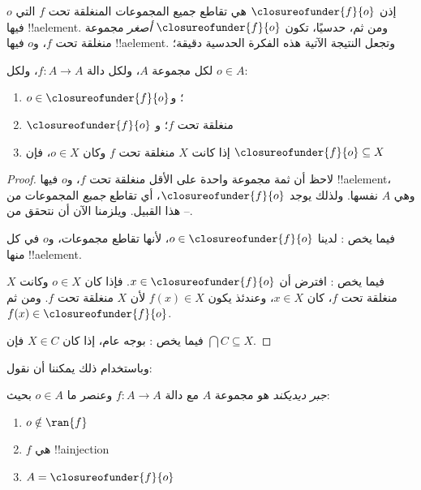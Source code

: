 \documentclass[../../../include/open-logic-section]{subfiles}
\begin{document}
إذن $\closureofunder{f}{o}$ هي تقاطع جميع المجموعات المنغلقة تحت $f$
التي $o$ فيها !!a{element}. ومن ثم، حدسيًا، تكون
$\closureofunder{f}{o}$ \emph{أصغر} مجموعة منغلقة تحت $f$، و$o$ فيها
!!a{element}. وتجعل النتيجة الآتية هذه الفكرة الحدسية دقيقة؛
\begin{lem}
	لكل مجموعة $A$، ولكل دالة $f\colon A\to A$، ولكل $o \in A$:
	\begin{enumerate}
		\item{} $o \in \closureofunder{f}{o}$؛ و
		\item{} $\closureofunder{f}{o}$ منغلقة تحت $f$؛ و
		\item{} إذا كانت $X$ منغلقة تحت $f$ وكان $o \in
		X$، فإن $\closureofunder{f}{o} \subseteq X$
	\end{enumerate}
\end{lem}

\begin{proof}
لاحظ أن ثمة مجموعة واحدة على الأقل منغلقة تحت $f$، و$o$ فيها
!!a{element}، وهي $A$ نفسها. ولذلك يوجد $\closureofunder{f}{o}$، أي تقاطع
\emph{جميع} المجموعات من هذا القبيل. ويلزمنا الآن أن نتحقق من
--.

فيما يخص : لدينا $o \in
\closureofunder{f}{o}$، لأنها تقاطع مجموعات، و$o$ في كل منها
!!a{element}.

فيما يخص : افترض أن $x \in
\closureofunder{f}{o}$. فإذا كان $o \in X$ وكانت $X$ منغلقة تحت $f$،
كان $x \in X$، وعندئذ يكون $f(x) \in X$ لأن $X$ منغلقة تحت $f$.
ومن ثم $f(x) \in \closureofunder{f}{o}$.

فيما يخص : بوجه عام، إذا كان $X
\in C$ فإن $\bigcap C \subseteq X$.
\end{proof}

وباستخدام ذلك يمكننا أن نقول:

\begin{defn}
\emph{جبر ديديكند} هو مجموعة $A$ مع دالة $f
\colon A \to A$ وعنصر ما $o \in A$ بحيث:
	\begin{enumerate}
		\item {} $o \notin \ran{f}$
		\item {} $f$ هي !!a{injection}
		\item {} $A = \closureofunder{f}{o}$
	\end{enumerate}
\end{defn}
\end{document}
